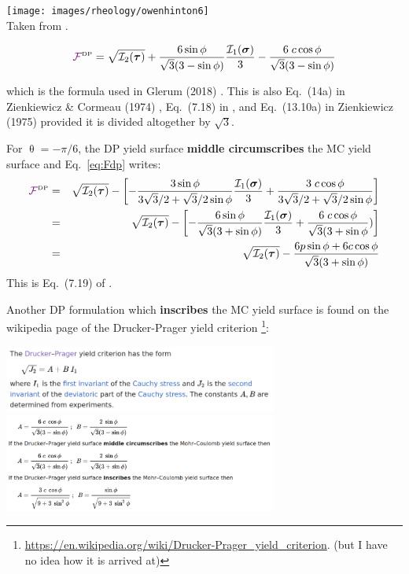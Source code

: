 \begin{center}
\texttt{[image: images/rheology/owenhinton6]}\\
{\captionfont Taken from \textcite{owhi}.}
\end{center}

\begin{mdframed}[backgroundcolor=blue!5]
\begin{equation}
{\color{violet}\cal F}^{\text{\tiny DP}}
= \sqrt{{\cal I}_2({\bm \tau})} 
+ \frac{ 6 \sin \phi }{ \sqrt{3}(3 - \sin\phi)} \frac{{\cal I}_1({\bm\sigma})}{3}
- \frac{ 6\; c \cos \phi }{ \sqrt{3}(3 - \sin\phi)} 
\end{equation}
\end{mdframed}

which is the formula used in Glerum \etal (2018) \cite{gltf18}.
This is also Eq.~(14a) in Zienkiewicz \& Cormeau (1974) \cite{zico74}, 
Eq.~(7.18) in \textcite{owhi}, and Eq.~(13.10a) in Zienkiewicz (1975) \cite{zien75} 
provided it is divided altogether by $\sqrt 3$. 


For $\uptheta=-\pi/6$, the DP yield surface {\bf middle circumscribes} the MC yield surface 
and Eq.~\eqref{eq:Fdp} writes:
\begin{eqnarray}
{\color{violet}\cal F}^{\text{\tiny DP}}
&=& \sqrt{{\cal I}_2({\bm \tau})} 
- \left[ -\frac{3 \sin\phi}{ 3 \sqrt{3}/2 + \sqrt{3}/2 \sin\phi}  \frac{{\cal I}_1({\bm \sigma})}{3}
+ \frac{ 3\; c \cos \phi }{ 3 \sqrt{3}/2 + \sqrt{3}/2 \sin\phi} \right] \nonumber\\
&=& \sqrt{{\cal I}_2({\bm \tau})} 
- \left[ -\frac{6 \sin\phi}{\sqrt{3} (3 + \sin\phi) }  \frac{{\cal I}_1({\bm \sigma})}{3}
+ \frac{ 6\; c \cos \phi }{ \sqrt{3}(3 + \sin\phi}) \right] \nonumber\\
&=& \sqrt{{\cal I}_2({\bm \tau})} 
- \frac{6 p \sin\phi + 6 c \cos \phi}{\sqrt{3} (3 + \sin\phi) } 
\end{eqnarray}
This is Eq.~(7.19) of \textcite{owhi}.

Another DP formulation which {\bf inscribes} the MC yield surface is found on the 
wikipedia page of the Drucker-Prager yield criterion
\footnote{\url{https://en.wikipedia.org/wiki/Drucker-Prager_yield_criterion}. 
(but I have no idea how it is arrived at)}:

\begin{center}
\includegraphics[width=9cm]{images/rheology/dp_wiki1}\\
\includegraphics[width=9cm]{images/rheology/dp_wiki2}\\
\end{center}

